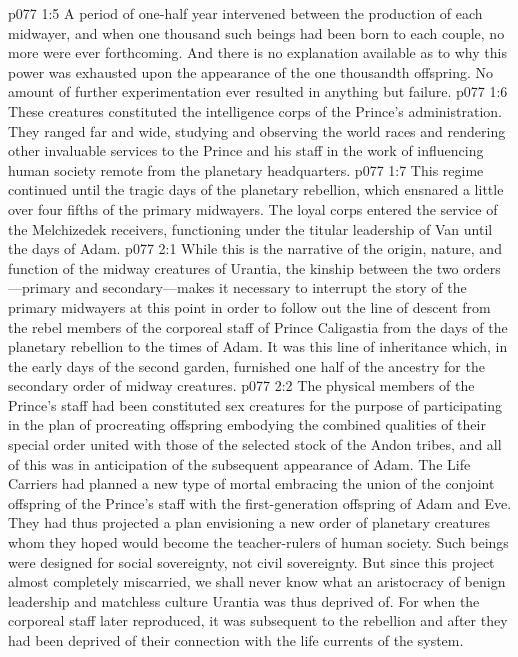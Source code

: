 \vs p077 1:5 A period of one\hyp{}half year intervened between the production of each midwayer, and when one thousand such beings had been born to each couple, no more were ever forthcoming. And there is no explanation available as to why this power was exhausted upon the appearance of the one thousandth offspring. No amount of further experimentation ever resulted in anything but failure.
\pc \vs p077 1:6 These creatures constituted the intelligence corps of the Prince’s administration. They ranged far and wide, studying and observing the world races and rendering other invaluable services to the Prince and his staff in the work of influencing human society remote from the planetary headquarters.
\vs p077 1:7 This regime continued until the tragic days of the planetary rebellion, which ensnared a little over four fifths of the primary midwayers. The loyal corps entered the service of the Melchizedek receivers, functioning under the titular leadership of Van until the days of Adam.
\vs p077 2:1 While this is the narrative of the origin, nature, and function of the midway creatures of Urantia, the kinship between the two orders---primary and secondary---makes it necessary to interrupt the story of the primary midwayers at this point in order to follow out the line of descent from the rebel members of the corporeal staff of Prince Caligastia from the days of the planetary rebellion to the times of Adam. It was this line of inheritance which, in the early days of the second garden, furnished one half of the ancestry for the secondary order of midway creatures.
\pc \vs p077 2:2 The physical members of the Prince’s staff had been constituted sex creatures for the purpose of participating in the plan of procreating offspring embodying the combined qualities of their special order united with those of the selected stock of the Andon tribes, and all of this was in anticipation of the subsequent appearance of Adam. The Life Carriers had planned a new type of mortal embracing the union of the conjoint offspring of the Prince’s staff with the first\hyp{}generation offspring of Adam and Eve. They had thus projected a plan envisioning a new order of planetary creatures whom they hoped would become the teacher\hyp{}rulers of human society. Such beings were designed for social sovereignty, not civil sovereignty. But since this project almost completely miscarried, we shall never know what an aristocracy of benign leadership and matchless culture Urantia was thus deprived of. For when the corporeal staff later reproduced, it was subsequent to the rebellion and after they had been deprived of their connection with the life currents of the system.
